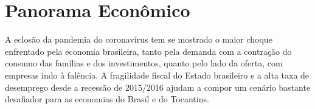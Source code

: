 \chapter{Panorama Econômico}
\par A eclosão da pandemia do coronavírus tem se mostrado o maior choque enfrentado pela economia brasileira, tanto pela demanda com a contração do consumo das famílias e dos investimentos, quanto pelo lado da oferta, com empresas indo à falência. A fragilidade fiscal do Estado brasileiro e a alta taxa de desemprego desde a recessão de 2015/2016 ajudam a compor um cenário bastante desafiador para as economias do Brasil e do Tocantins.
